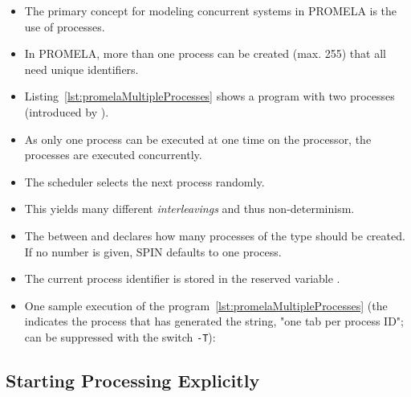 			\begin{itemize}
				\item The primary concept for modeling concurrent systems in PROMELA is the use of processes.
				\item In PROMELA, more than one process can be created (max. 255) that all need unique identifiers.
				\item Listing~\ref{lst:promelaMultipleProcesses} shows a program with two processes (introduced by ).
				\item As only one process can be executed at one time on the processor, the processes are executed concurrently.
				\item The scheduler selects the next process randomly.
				\item This yields many different \textit{interleavings} and thus non-determinism.
				\item The \inlinePromela{[2]} between  and  declares how many processes of the type should be created. If no number is given, SPIN defaults to one process.
				\item The current process identifier is stored in the reserved variable .
				\item One sample execution of the program~\ref{lst:promelaMultipleProcesses} (the indicates the process that has generated the string, "one tab per process ID"; can be suppressed with the switch \texttt{-T}):
			\end{itemize}

		\subsection{Starting Processing Explicitly}
			
		
